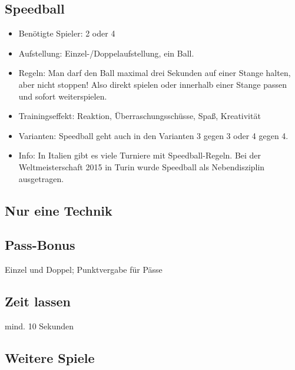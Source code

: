 \subsection{Speedball}
\label{spielformen:sonderregeln:speedball}

\begin{itemize}
\item Benötigte Spieler: 2 oder 4 
\item Aufstellung: Einzel-/Doppelaufstellung, ein Ball.
\item Regeln: Man darf den Ball maximal drei Sekunden auf einer Stange halten, aber
nicht stoppen! Also direkt spielen oder innerhalb einer Stange passen und sofort
weiterspielen.
\item Trainingseffekt: Reaktion, Überraschungsschüsse, Spaß, Kreativität
\item Varianten: Speedball geht auch in den Varianten 3 gegen 3 oder 4 gegen 4.  
\item Info: In Italien gibt es viele Turniere mit Speedball-Regeln. Bei der Weltmeisterschaft 2015 in Turin wurde Speedball als Nebendisziplin ausgetragen. 
\end{itemize}

\subsection{Nur eine Technik}
\label{spielformen:sonderregeln:nureinetechnik}



\subsection{Pass-Bonus}
\label{spielformen:sonderregeln:passbonus}
Einzel und Doppel; Punktvergabe für Pässe

\subsection{Zeit lassen}
\label{spielformen:sonderregeln:zeitlassen}
mind. 10 Sekunden 

\subsection{Weitere Spiele}
\label{spielformen:sonderregeln:weiteres}

